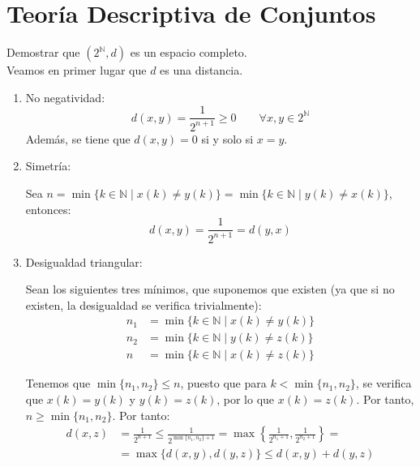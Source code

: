 \section{Teoría Descriptiva de Conjuntos}

    \begin{ejercicio}
    Demostrar que $(2^\mathbb{N}, d)$ es un espacio completo. \\

    Veamos en primer lugar que $d$ es una distancia.
    \begin{enumerate}
        \item No negatividad:
            \begin{equation*}
                d(x,y) = \frac{1}{2^{n+1}} \geq 0 \qquad \forall x,y\in 2^\mathbb{N}
            \end{equation*}
            Además, se tiene que $d(x,y) = 0$ si y solo si $x = y$.

        \item Simetría:
        
            Sea $n=\min\{k\in \mathbb{N} \mid x(k) \neq y(k)\}=\min\{k\in \mathbb{N} \mid y(k) \neq x(k)\}$, entonces:
            \begin{equation*}
                d(x,y) = \frac{1}{2^{n+1}} = d(y,x)
            \end{equation*}

        \item Desigualdad triangular:
        
            Sean los siguientes tres mínimos, que suponemos que existen (ya que si no existen, la desigualdad se verifica trivialmente):
            \begin{align*}
                n_1 &= \min\{k\in \mathbb{N} \mid x(k) \neq y(k)\} \\
                n_2 &= \min\{k\in \mathbb{N} \mid y(k) \neq z(k)\} \\
                n &= \min\{k\in \mathbb{N} \mid x(k) \neq z(k)\}
            \end{align*}

            Tenemos que $\min\{n_1,n_2\} \leq n$, puesto que para $k<\min\{n_1,n_2\}$, se verifica que $x(k) = y(k)$ y $y(k) = z(k)$, por lo que $x(k) = z(k)$. Por tanto, $n\geq \min\{n_1,n_2\}$. Por tanto:
            \begin{align*}
                d(x,z) &= \frac{1}{2^{n+1}} \leq \frac{1}{2^{\min\{n_1,n_2\}+1}} = \max\left\{\frac{1}{2^{n_1+1}},\frac{1}{2^{n_2+1}}\right\} =\\&= \max\{d(x,y),d(y,z)\}\leq d(x,y) + d(y,z)
            \end{align*}
    \end{enumerate}


\end{ejercicio}
